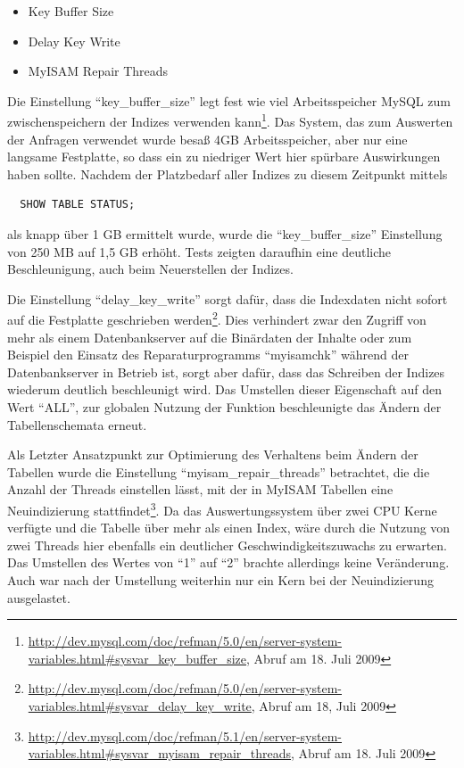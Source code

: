 \documentclass[10pt]{scrartcl}
\begin{document}
\begin{itemize}
  \item Key Buffer Size
  \item Delay Key Write
  \item MyISAM Repair Threads
\end{itemize}

Die Einstellung ``key\_buffer\_size'' legt fest wie viel Arbeitsspeicher MySQL zum zwischenspeichern der Indizes verwenden kann\footnote{\url{http://dev.mysql.com/doc/refman/5.0/en/server-system-variables.html#sysvar_key_buffer_size}, Abruf am 18. Juli 2009}. Das System, das zum Auswerten der Anfragen verwendet wurde besaß 4GB Arbeitsspeicher, aber nur eine langsame Festplatte, so dass ein zu niedriger Wert hier spürbare Auswirkungen haben sollte. Nachdem der Platzbedarf aller Indizes zu diesem Zeitpunkt mittels

\begin{verbatim}
  SHOW TABLE STATUS;
\end{verbatim}

als knapp über 1 GB ermittelt wurde, wurde die ``key\_buffer\_size'' Einstellung von 250 MB auf 1,5 GB erhöht. Tests zeigten daraufhin eine deutliche Beschleunigung, auch beim Neuerstellen der Indizes.

Die Einstellung ``delay\_key\_write'' sorgt dafür, dass die Indexdaten nicht sofort auf die Festplatte geschrieben werden\footnote{\url{http://dev.mysql.com/doc/refman/5.0/en/server-system-variables.html#sysvar_delay_key_write}, Abruf am 18, Juli 2009}. Dies verhindert zwar den Zugriff von mehr als einem Datenbankserver auf die Binärdaten der Inhalte oder zum Beispiel den Einsatz des Reparaturprogramms ``myisamchk'' während der Datenbankserver in Betrieb ist, sorgt aber dafür, dass das Schreiben der Indizes wiederum deutlich beschleunigt wird. Das Umstellen dieser Eigenschaft auf den Wert ``ALL'', zur globalen Nutzung der Funktion beschleunigte das Ändern der Tabellenschemata erneut.

Als Letzter Ansatzpunkt zur Optimierung des Verhaltens beim Ändern der Tabellen wurde die Einstellung ``myisam\_repair\_threads'' betrachtet, die die Anzahl der Threads einstellen lässt, mit der in MyISAM Tabellen eine Neuindizierung stattfindet\footnote{\url{http://dev.mysql.com/doc/refman/5.1/en/server-system-variables.html#sysvar_myisam_repair_threads}, Abruf am 18. Juli 2009}. Da das Auswertungssystem über zwei CPU Kerne verfügte und die Tabelle über mehr als einen Index, wäre durch die Nutzung von zwei Threads hier ebenfalls ein deutlicher Geschwindigkeitszuwachs zu erwarten. Das Umstellen des Wertes von ``1'' auf ``2'' brachte allerdings keine Veränderung. Auch war nach der Umstellung weiterhin nur ein Kern bei der Neuindizierung ausgelastet.
\end{document}
